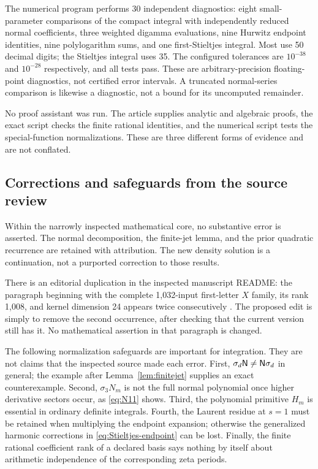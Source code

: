 The numerical program performs 30 independent diagnostics: eight
small-parameter comparisons of the compact integral with independently
reduced normal coefficients, three weighted digamma evaluations, nine
Hurwitz endpoint identities, nine polylogarithm sums, and one
first-Stieltjes integral. Most use 50 decimal digits; the Stieltjes
integral uses 35. The configured tolerances are $10^{-38}$ and
$10^{-28}$ respectively, and all tests pass. These are arbitrary-precision
floating-point diagnostics, not certified error intervals. A truncated
normal-series comparison is likewise a diagnostic, not a bound for its
uncomputed remainder.

No proof assistant was run. The article supplies analytic and algebraic
proofs, the exact script checks the finite rational identities, and the
numerical script tests the special-function normalizations. These are
three different forms of evidence and are not conflated.

\subsection{Corrections and safeguards from the source review}
Within the narrowly inspected mathematical core, no substantive error is
asserted. The normal decomposition, the finite-jet lemma, and the prior
quadratic recurrence are retained with attribution. The new density
solution is a continuation, not a purported correction to those results.

There is an editorial duplication in the inspected manuscript README:
the paragraph beginning with the complete 1,032-input first-letter $X$
family, its rank 1,008, and kernel dimension 24 appears twice
consecutively \cite{RepoMain}. The proposed edit is simply to remove the
second occurrence, after checking that the current version still has it.
No mathematical assertion in that paragraph is changed.

The following normalization safeguards are important for integration.
They are not claims that the inspected source made each error. First,
$\sigma_d\mathsf N\ne\mathsf N\sigma_d$ in general; the example after
Lemma~\ref{lem:finitejet} supplies an exact counterexample. Second,
$\sigma_3N_m$ is not the full normal polynomial once higher derivative
sectors occur, as \eqref{eq:N11} shows. Third, the polynomial primitive
$H_m$ is essential in ordinary definite integrals. Fourth, the Laurent
residue at $s=1$ must be retained when multiplying the endpoint expansion;
otherwise the generalized harmonic corrections in
\eqref{eq:Stieltjes-endpoint} can be lost. Finally, the finite rational
coefficient rank of a declared basis says nothing by itself about
arithmetic independence of the corresponding zeta periods.

